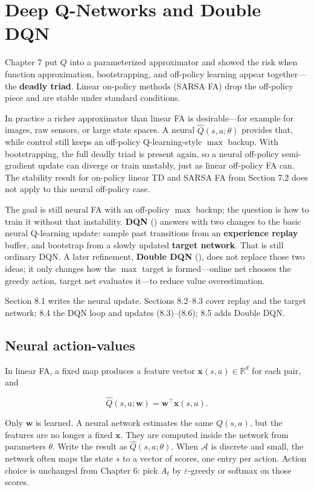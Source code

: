 \chapter{Deep Q-Networks and Double DQN}

Chapter 7 put $Q$ into a parameterized approximator and showed the risk when function approximation, bootstrapping, and off-policy learning appear together---the \textbf{deadly triad}. Linear on-policy methods (SARSA FA) drop the off-policy piece and are stable under standard conditions.

In practice a richer approximator than linear FA is desirable---for example for images, raw sensors, or large state spaces. A neural $\hat{Q}(s,a;\theta)$ provides that, while control still keeps an off-policy Q-learning-style $\max$ backup. With bootstrapping, the full deadly triad is present again, so a neural off-policy semi-gradient update can diverge or train unstably, just as linear off-policy FA can. The stability result for on-policy linear TD and SARSA FA from Section 7.2 does not apply to this neural off-policy case.

The goal is still neural FA with an off-policy $\max$ backup; the question is how to train it without that instability. \textbf{DQN} () answers with two changes to the basic neural Q-learning update: sample past transitions from an \textbf{experience replay} buffer, and bootstrap from a slowly updated \textbf{target network}. That is still ordinary DQN. A later refinement, \textbf{Double DQN} (), does not replace those two ideas; it only changes how the $\max$ target is formed---online net chooses the greedy action, target net evaluates it---to reduce value overestimation.

Section 8.1 writes the neural update. Sections 8.2--8.3 cover replay and the target network; 8.4 the DQN loop and updates (8.3)--(8.6); 8.5 adds Double DQN.

\section{Neural action-values}

In linear FA, a fixed map produces a feature vector $\mathbf{x}(s,a)\in\mathbb{R}^d$ for each pair, and

\[
\hat{Q}(s,a;\mathbf{w})=\mathbf{w}^\top\mathbf{x}(s,a).
\]

Only $\mathbf{w}$ is learned. A neural network estimates the same $Q(s,a)$, but the features are no longer a fixed $\mathbf{x}$. They are computed inside the network from parameters $\theta$. Write the result as $\hat{Q}(s,a;\theta)$. When $\mathcal{A}$ is discrete and small, the network often maps the state $s$ to a vector of scores, one entry per action. Action choice is unchanged from Chapter 6: pick $A_t$ by $\varepsilon$-greedy or softmax on those scores.

